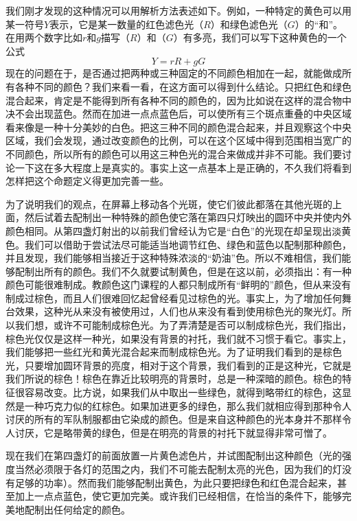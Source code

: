 我们刚才发现的这种情况可以用解析方法表述如下。例如，一种特定的黄色可以用某一符号$Y$表示，它是某一数量的红色滤色光（$R$）和绿色滤色光（$G$）的“和”。在用两个数字比如$r$和$g$描写（$R$）和（$G$）有多亮，我们可以写下这种黄色的一个公式
\begin{equation}
    \label{Eq:I:35:1}
    Y = rR + gG
\end{equation}
现在的问题在于，是否通过把两种或三种固定的不同颜色相加在一起，就能做成所有各种不同的颜色？我们来看一看，在这方面可以得到什么结论。只把红色和绿色混合起来，肯定是不能得到所有各种不同的颜色的，因为比如说在这样的混合物中决不会出现蓝色。然而在加进一点点蓝色后，可以使所有三个斑点重叠的中央区域看来像是一种十分美妙的白色。把这三种不同的颜色混合起来，并且观察这个中央区域，我们会发现，通过改变颜色的比例，可以在这个区域中得到范围相当宽广的不同颜色，所以所有的颜色可以用这三种色光的混合来做成并非不可能。我们要讨论一下这在多大程度上是真实的。事实上这一点基本上是正确的，不久我们将看到怎样把这个命题定义得更加完善一些。

为了说明我们的观点，在屏幕上移动各个光斑，使它们彼此都落在其他光斑的上面，然后试着去配制出一种特殊的颜色使它落在第四只灯映出的圆环中央并使内外颜色相同。从第四盏灯射出的以前我们曾经认为它是“白色”的光现在却呈现出淡黄色。我们可以借助于尝试法尽可能适当地调节红色、绿色和蓝色以配制那种颜色，并且发现，我们能够相当接近于这种特殊浓淡的“奶油”色。所以不难相信，我们能够配制出所有的颜色。我们不久就要试制黄色，但是在这以前，必须指出：有一种颜色可能很难制成。教颜色这门课程的人都只制成所有“鲜明的”颜色，但从来没有制成过棕色，而且人们很难回忆起曾经看见过棕色的光。事实上，为了增加任何舞台效果，这种光从来没有被使用过，人们也从来没有看到使用棕色光的聚光灯。所以我们想，或许不可能制成棕色光。为了弄清楚是否可以制成棕色光，我们指出，棕色光仅仅是这样一种光，如果没有背景的衬托，我们就不习惯于看它。事实上，我们能够把一些红光和黄光混合起来而制成棕色光。为了证明我们看到的是棕色光，只要增加圆环背景的亮度，相对于这个背景，我们看到的正是这种光，它就是我们所说的棕色！棕色在靠近比较明亮的背景时，总是一种深暗的颜色。棕色的特征很容易改变。比方说，如果我们从中取出一些绿色，就得到略带红的棕色，这显然是一种巧克力似的红棕色。如果加进更多的绿色，那么我们就相应得到那种令人讨厌的所有的军队制服都由它染成的颜色。但是来自这种颜色的光本身并不那样令人讨厌，它是略带黄的绿色，但是在明亮的背景的衬托下就显得非常可憎了。

现在我们在第四盏灯的前面放置一片黄色滤色片，并试图配制出这种颜色（光的强度当然必须限于各灯的范围之内，我们不可能去配制太亮的光色，因为我们的灯没有足够的功率）。然而我们能够配制出黄色，为此只要把绿色和红色混合起来，甚至加上一点点蓝色，使它更加完美。或许我们已经相信，在恰当的条件下，能够完美地配制出任何给定的颜色。


